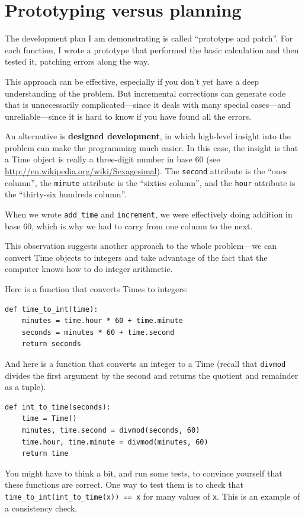 \documentclass[10pt]{book}
\begin{document}
\section{Prototyping versus planning}
\label{prototype}

The development plan I am demonstrating is called ``prototype and
patch''.  For each function, I wrote a prototype that performed the
basic calculation and then tested it, patching errors along the
way.

This approach can be effective, especially if you don't yet have a
deep understanding of the problem.  But incremental corrections can
generate code that is unnecessarily complicated---since it deals with
many special cases---and unreliable---since it is hard to know if you
have found all the errors.

An alternative is {\bf designed development}, in which high-level
insight into the problem can make the programming much easier.  In
this case, the insight is that a Time object is really a three-digit
number in base 60 (see \url{http://en.wikipedia.org/wiki/Sexagesimal}).  The
{\tt second} attribute is the ``ones column'', the {\tt minute}
attribute is the ``sixties column'', and the {\tt hour} attribute is
the ``thirty-six hundreds column''.

When we wrote \verb"add_time" and {\tt increment}, we were effectively
doing addition in base 60, which is why we had to carry from one
column to the next.

This observation suggests another approach to the whole problem---we
can convert Time objects to integers and take advantage of the fact
that the computer knows how to do integer arithmetic.

Here is a function that converts Times to integers:

\begin{verbatim}
def time_to_int(time):
    minutes = time.hour * 60 + time.minute
    seconds = minutes * 60 + time.second
    return seconds
\end{verbatim}
%
And here is a function that converts an integer to a Time
(recall that {\tt divmod} divides the first argument by the second
and returns the quotient and remainder as a tuple).

\begin{verbatim}
def int_to_time(seconds):
    time = Time()
    minutes, time.second = divmod(seconds, 60)
    time.hour, time.minute = divmod(minutes, 60)
    return time
\end{verbatim}
%
You might have to think a bit, and run some tests, to convince
yourself that these functions are correct.  One way to test them is to
check that \verb"time_to_int(int_to_time(x)) == x" for many values of
{\tt x}.  This is an example of a consistency check.
\end{document}
